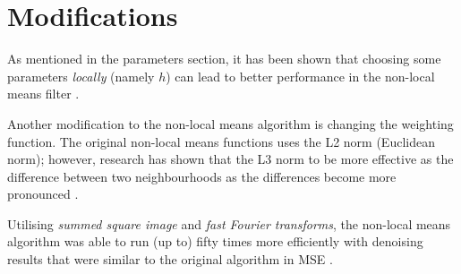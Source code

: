 \section{Modifications}

As mentioned in the parameters section, 
it has been shown that choosing some parameters \emph{locally} (namely $h$) 
can lead to better performance in the non-local means filter \cite{duval2010parameter}.

Another modification to the non-local means algorithm is changing the 
weighting function. 
The original non-local means functions uses the L2 norm (Euclidean norm);
however, research has shown that the L3 norm to be more effective as the
difference between two neighbourhoods as the differences become more pronounced 
\cite{wahid2015modified}.

Utilising \emph{summed square image} and \emph{fast Fourier transforms},
the non-local means algorithm was able to run (up to) fifty times more efficiently
with denoising results that were similar to the original algorithm in MSE \cite{wang2006fast}.
